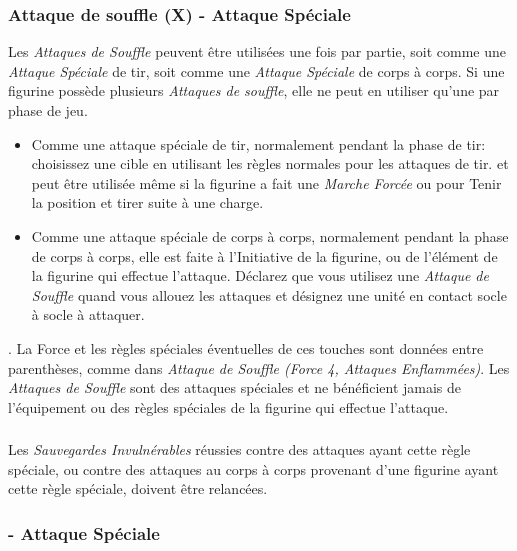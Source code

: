 \subsubsection*{Attaque de souffle (X) - Attaque Spéciale}

Les \emph{Attaques de Souffle} peuvent être utilisées une fois par partie, soit comme une \emph{Attaque Spéciale} de tir, soit comme une \emph{Attaque Spéciale} de corps à corps. Si une figurine possède plusieurs \emph{Attaques de souffle}, elle ne peut en utiliser qu'une par phase de jeu.
\begin{itemize}[label={-}]
\item Comme une attaque spéciale de tir, normalement pendant la phase de tir: choisissez une cible en utilisant les règles normales pour les attaques de tir.  et peut être utilisée même si la figurine a fait une \emph{Marche Forcée} ou pour Tenir la position et tirer suite à une charge.
\item Comme une attaque spéciale de corps à corps, normalement pendant la phase de corps à corps, elle est faite à l'Initiative de la figurine, ou de l'élément de la figurine qui effectue l'attaque. Déclarez que vous utilisez une \emph{Attaque de Souffle} quand vous allouez les attaques et désignez une unité en contact socle à socle à attaquer.
\end{itemize}

. La Force et les règles spéciales éventuelles de ces touches sont données entre parenthèses, comme dans \emph{Attaque de Souffle (\emph{Force 4}, Attaques Enflammées)}. Les \emph{Attaques de Souffle} sont des attaques spéciales et ne bénéficient jamais de l'équipement ou des règles spéciales de la figurine qui effectue l'attaque.

\subsubsection*{}

Les \emph{Sauvegardes Invulnérables} réussies contre des attaques ayant cette règle spéciale, ou contre des attaques au corps à corps provenant d'une figurine ayant cette règle spéciale, doivent être relancées.

\subsubsection*{ - Attaque Spéciale}

